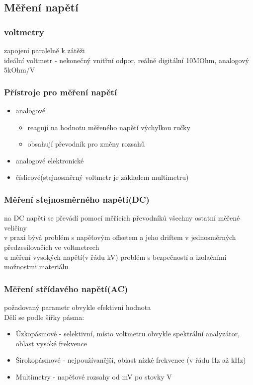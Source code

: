 \subsection*{Měření napětí}
\subsubsection*{voltmetry}
zapojení paralelně k zátěži\\
ideální voltmetr - nekonečný vnitřní odpor, reálně digitální 10MOhm, analogový 5kOhm/V \\
\subsubsection*{Přístroje pro měření napětí}
\begin{itemize}
    \item analogové
          \begin{itemize}
              \item reagují na hodnotu měřeného napětí výchylkou ručky
              \item obsahují převodník pro změny rozsahů
          \end{itemize}
    \item analogové elektronické
    \item číslicové(stejnosměrný voltmetr je základem multimetru)
\end{itemize}
\subsubsection*{Měření stejnosměrného napětí(DC)}
na DC napětí se převádí pomocí měřicích převodníků všechny ostatní měřené veličiny\\
v praxi bývá problém s napěťovým offsetem a jeho driftem v jednosměrných předzesilovačích ve voltmetrech\\
u měření vysokých napětí(v řádu kV) problém s bezpečností a izolačními možnostmi materiálu\\
\subsubsection*{Měření střídavého napětí(AC)}
požadovaný parametr obvykle efektivní hodnota\\
Dělí se podle šířky pásma:
\begin{itemize}
    \item Úzkopásmové - selektivní, místo voltmetru obvykle spektrální analyzátor, oblast vysoké frekvence
    \item Širokopásmové - nejpoužívanější, oblast nízké frekvence (v řádu Hz až kHz)
    \item Multimetry - napěťové rozsahy od mV po stovky V
\end{itemize}
\newpage

